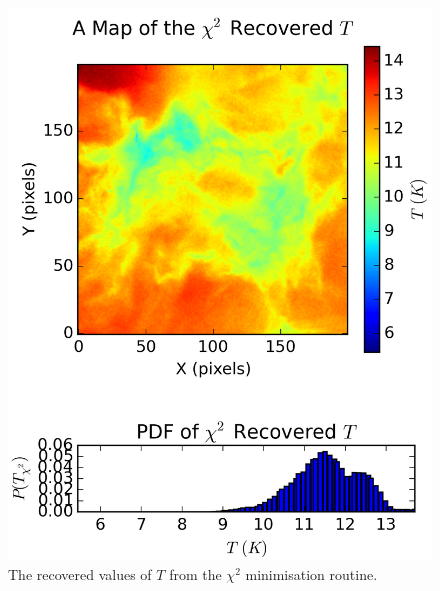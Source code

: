 \documentclass{report}
\begin{document}
\begin{figure}[H]
{\begin{minipage}[b]{0.34\linewidth}
    \includegraphics[width=\linewidth]{../img/sph/map_T_chi.png}
    \caption{\protect The recovered values of $T$ from the $\chi^{2}$ minimisation routine.}\label{fig:map_T_chi_sph}
    \vspace{4ex}
  \end{minipage}%
  \begin{minipage}[b]{0.34\linewidth}
    \centering

\end{minipage}}
\end{figure}
\end{document}
